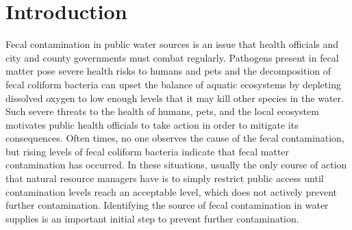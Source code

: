 \chapter{Introduction}\label{chap:introduction}
Fecal contamination in public water sources is an issue that health officials and city and county governments must combat regularly.
Pathogens present in fecal matter pose severe health risks to humans and pets
and
the decomposition of fecal coliform bacteria can upset the balance of aquatic ecosystems by depleting dissolved oxygen to low enough levels that it may kill other species in the water.
Such severe threats to the health of humans, pets, and the local ecosystem motivates public health officials to take action in order to mitigate its consequences.
Often times, no one observes the cause of the fecal contamination, but rising levels of fecal coliform bacteria indicate that fecal matter contamination has occurred.
In these situations, usually the only course of action that natural resource managers have is to simply restrict public access until contamination levels reach an acceptable level, which does not actively prevent further contamination.
Identifying the source of fecal contamination in water supplies is an important initial step to prevent further contamination.

